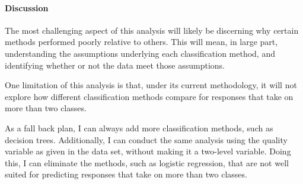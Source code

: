 \documentclass[12pt]{article}
\begin{document}
\paragraph{Discussion}

The most challenging aspect of this analysis will likely be discerning why certain 
methods performed poorly relative to others.  This will mean, in large part, 
understanding the assumptions underlying each classification method, and identifying 
whether or not the data meet those assumptions.  

One limitation of this analysis is that, under its current methodology, it will not 
explore how different classification methods compare for responses that take on more 
than two classes.  

As a fall back plan, I can always add more classification methods, such as decision 
trees.  Additionally, I can conduct the same analysis using the quality variable as 
given in the data set, without making it a two-level variable.  Doing this, I can 
eliminate the methods, such as logistic regression, that are not well suited for 
predicting responses that take on more than two classes.  



\end{document}
